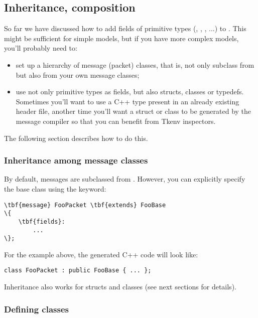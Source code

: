 \subsection{Inheritance, composition}

So far we have discussed how to add fields of primitive types
(, , , ...) to .
This might be sufficient for simple models, but if you have
more complex models, you'll probably need to:

\begin{itemize}
  \item set up a hierarchy of message (packet) classes, that is,
    not only subclass from  but also from your
    own message classes;
  \item use not only primitive types as fields, but also structs,
    classes or typedefs. Sometimes you'll want to use a C++ type
    present in an already existing header file, another time you'll
    want a struct or class to be generated by the message
    compiler so that you can benefit from Tkenv inspectors.
\end{itemize}

The following section describes how to do this.


\subsubsection{Inheritance among message classes}

By default, messages are subclassed from . However, you can
explicitly specify the base class using the  keyword:

\begin{Verbatim}[commandchars=\\\{\}]
\tbf{message} FooPacket \tbf{extends} FooBase
\{
    \tbf{fields}:
        ...
\};
\end{Verbatim}

For the example above, the generated C++ code will look like:

\begin{verbatim}
class FooPacket : public FooBase { ... };
\end{verbatim}

Inheritance also works for structs and classes (see next sections
for details).



\subsubsection{Defining classes}

